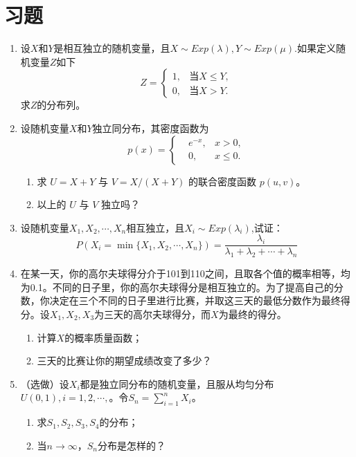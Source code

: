 \section{习题}

\begin{enumerate}
\item 设$X$和$Y$是相互独立的随机变量，且$X \sim Exp(\lambda),Y \sim Exp(\mu)$.如果定义随机变量$Z$如下
$$
Z = \left\{\begin{aligned}
    1, &  \text{当}X\leq Y,\\
	 0, &  \text{当}X > Y.
\end{aligned}
\right.
$$
求$Z$的分布列。

\item 设随机变量$X$和$Y$独立同分布，其密度函数为
$$
 p(x) = \left\{\begin{aligned}
      &e^{-x}, &  x > 0,\\
	 &0, &  x\leq0.
 \end{aligned}\right.
	$$
\begin{enumerate}
    \item 求 $U = X + Y$ 与 $V = X/(X + Y)$ 的联合密度函数 $p(u,v)$。
    \item 以上的 $U$ 与 $V$ 独立吗？
\end{enumerate}

\item 设随机变量$X_1,X_2,\cdots,X_n$相互独立，且$X_i\sim Exp(\lambda_i)$,试证：
$$P(X_i = \min\{X_1,X_2,\cdots,X_n\}) = \frac{\lambda_i}{\lambda_1 + \lambda_2 +\cdots+ \lambda_n}
$$

\item 在某一天，你的高尔夫球得分介于101到110之间，且取各个值的概率相等，均为0.1。不同的日子里，你的高尔夫球得分是相互独立的。为了提高自己的分数，你决定在三个不同的日子里进行比赛，并取这三天的最低分数作为最终得分。设$X_1,X_2,X_3$为三天的高尔夫球得分，而$X$为最终的得分。
\begin{enumerate}
    \item 计算$X$的概率质量函数；
    \item 三天的比赛让你的期望成绩改变了多少？ 
\end{enumerate}

\item （选做）设$X_i$都是独立同分布的随机变量，且服从均匀分布$U(0,1),i=1,2,\cdots,$。令$S_n = \sum_{i=1}^n X_i$。
\begin{enumerate}
    \item 求$S_1,S_2,S_3,S_4$的分布；
    \item 当$n\rightarrow\infty$，$S_n$分布是怎样的？
\end{enumerate}
\end{enumerate}